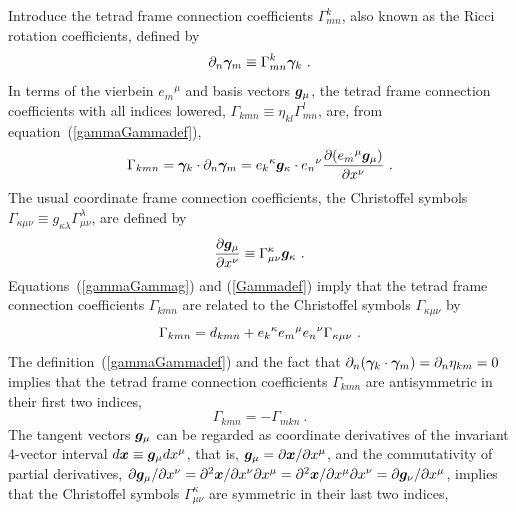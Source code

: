 \documentclass[twocolumn,showpacs,preprintnumbers,amsmath,amssymb,prb]{revtex4}
\begin{document}
Introduce the tetrad frame connection coefficients $\Gamma^k_{mn}$,
also known as the Ricci rotation coefficients,
defined by
\begin{equation}
\label{gammaGammadef}
  \partial_n \bm{\gamma}_m \equiv \Gamma^k_{mn} \bm{\gamma}_k
  \ .
\end{equation}
In terms of the vierbein ${e_m}^\mu$ and basis vectors $\bm{g}_\mu$,
the tetrad frame connection coefficients
with all indices lowered,
$\Gamma_{kmn} \equiv \eta_{kl} \Gamma^l_{mn}$,
are, from equation~(\ref{gammaGammadef}),
\begin{equation}
\label{gammaGammag}
  \Gamma_{kmn}
  = \bm{\gamma}_k \cdot \partial_n \bm{\gamma}_m
  = {e_k}^\kappa \bm{g}_\kappa \cdot {e_n}^\nu
  {\partial ({e_m}^\mu \bm{g}_\mu) \over \partial x^\nu}
  \ .
\end{equation}
The usual coordinate frame connection coefficients,
the Christoffel symbols
$\Gamma_{\kappa\mu\nu} \equiv g_{\kappa\lambda} \Gamma^\lambda_{\mu\nu}$,
are defined by
\begin{equation}
\label{Gammadef}
  {\partial \bm{g}_\mu \over \partial x^\nu}
  \equiv
  \Gamma^\kappa_{\mu\nu} \bm{g}_\kappa
  \ .
\end{equation}
Equations~(\ref{gammaGammag}) and (\ref{Gammadef})
imply that the tetrad frame connection coefficients
$\Gamma_{kmn}$
are related to the Christoffel symbols
$\Gamma_{\kappa\mu\nu}$
by
\begin{equation}
\label{GammaGamma}
  \Gamma_{kmn}
  =
  d_{kmn}
  +
  {e_k}^\kappa {e_m}^\mu {e_n}^\nu
  \Gamma_{\kappa\mu\nu}
  \ .
\end{equation}
The definition~(\ref{gammaGammadef})
and the fact that
$\partial_n ( \bm{\gamma}_k \cdot \bm{\gamma}_m ) = \partial_n \eta_{km} = 0$
implies that the tetrad frame connection coefficients
$\Gamma_{kmn}$
are antisymmetric in their first two indices,
\begin{equation}
\label{Gammaantisym}
  \Gamma_{kmn} = - \Gamma_{mkn}
  \ .
\end{equation}
The tangent vectors
$\bm{g}_\mu$
can be regarded as coordinate derivatives of the invariant 4-vector interval
$d \bm{x} \equiv \bm{g}_\mu d x^\mu$,
that is,
$\bm{g}_\mu = \partial \bm{x} / \partial x^\mu$,
and the commutativity of partial derivatives,
$\partial \bm{g}_\mu / \partial x^\nu
=
\partial^2 \bm{x} / \partial x^\nu \partial x^\mu
=
\partial^2 \bm{x} / \partial x^\mu \partial x^\nu
=
\partial \bm{g}_\nu / \partial x^\mu$,
implies that the Christoffel symbols
$\Gamma^\kappa_{\mu\nu}$
are symmetric in their last two indices,
\end{document}

